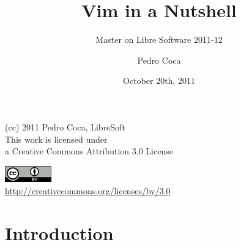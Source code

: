 \documentclass{beamer}
\begin{document}
\title{Vim in a Nutshell}
\subtitle{Master on Libre Software 2011-12}
\author{Pedro Coca} 
\date{October 20th, 2011}


\begin{frame}
  \vspace{2cm}
  \begin{center}
    {\small (cc) 2011 Pedro Coca, LibreSoft} \\
    \medskip
    {\scriptsize This work is licensed under \\ a Creative Commons Attribution 3.0 License}
  \end{center}
  \begin{center}
    \href{http://creativecommons.org/licenses/by/3.0/es}{\includegraphics[width=2cm]{format/cc-by.png}} \\
    {\tiny \url{http://creativecommons.org/licenses/by/3.0}}
  \end{center}
\end{frame}%

\usebackgroundtemplate{}


\section{Introduction}
\end{document}
